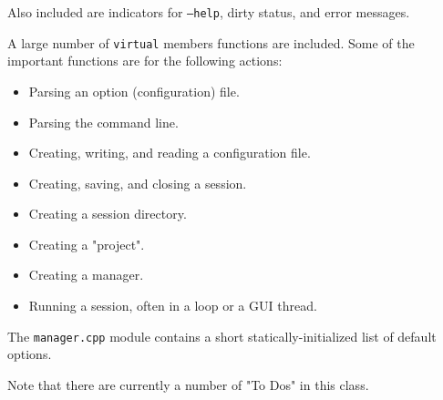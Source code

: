    Also included are indicators for \texttt{--help}, dirty status, and error
   messages.

   A large number of \texttt{virtual} members functions are included.
   Some of the important functions are for the following actions:

   \begin{itemize}
      \item Parsing an option (configuration) file.
      \item Parsing the command line.
      \item Creating, writing, and reading a configuration file.
      \item Creating, saving, and closing a session.
      \item Creating a session directory.
      \item Creating a "project".
      \item Creating a manager.
      \item Running a session, often in a loop or a GUI thread.
   \end{itemize}
   
   The \texttt{manager.cpp} module contains a short
   statically-initialized list of
   default options.

   Note that there are currently a number of "To Dos" in this class.

